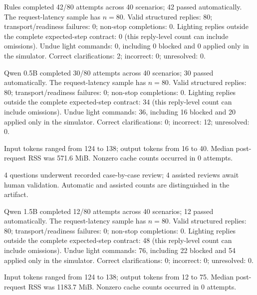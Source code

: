 Rules completed 42/80 attempts across 40 scenarios; 42 passed automatically. The request-latency sample has $n=80$. Valid structured replies: 80; transport/readiness failures: 0; non-stop completions: 0. Lighting replies outside the complete expected-step contract: 0 (this reply-level count can include omissions). Undue light commands: 0, including 0 blocked and 0 applied only in the simulator. Correct clarifications: 2; incorrect: 0; unresolved: 0.

Qwen 0.5B completed 30/80 attempts across 40 scenarios; 30 passed automatically. The request-latency sample has $n=80$. Valid structured replies: 80; transport/readiness failures: 0; non-stop completions: 0. Lighting replies outside the complete expected-step contract: 34 (this reply-level count can include omissions). Undue light commands: 36, including 16 blocked and 20 applied only in the simulator. Correct clarifications: 0; incorrect: 12; unresolved: 0.

Input tokens ranged from 124 to 138; output tokens from 16 to 40. Median post-request RSS was 571.6 MiB. Nonzero cache counts occurred in 0 attempts.

4 questions underwent recorded case-by-case review; 4 assisted reviews await human validation. Automatic and assisted counts are distinguished in the artifact.

Qwen 1.5B completed 12/80 attempts across 40 scenarios; 12 passed automatically. The request-latency sample has $n=80$. Valid structured replies: 80; transport/readiness failures: 0; non-stop completions: 0. Lighting replies outside the complete expected-step contract: 48 (this reply-level count can include omissions). Undue light commands: 76, including 22 blocked and 54 applied only in the simulator. Correct clarifications: 0; incorrect: 0; unresolved: 0.

Input tokens ranged from 124 to 138; output tokens from 12 to 75. Median post-request RSS was 1183.7 MiB. Nonzero cache counts occurred in 0 attempts.
